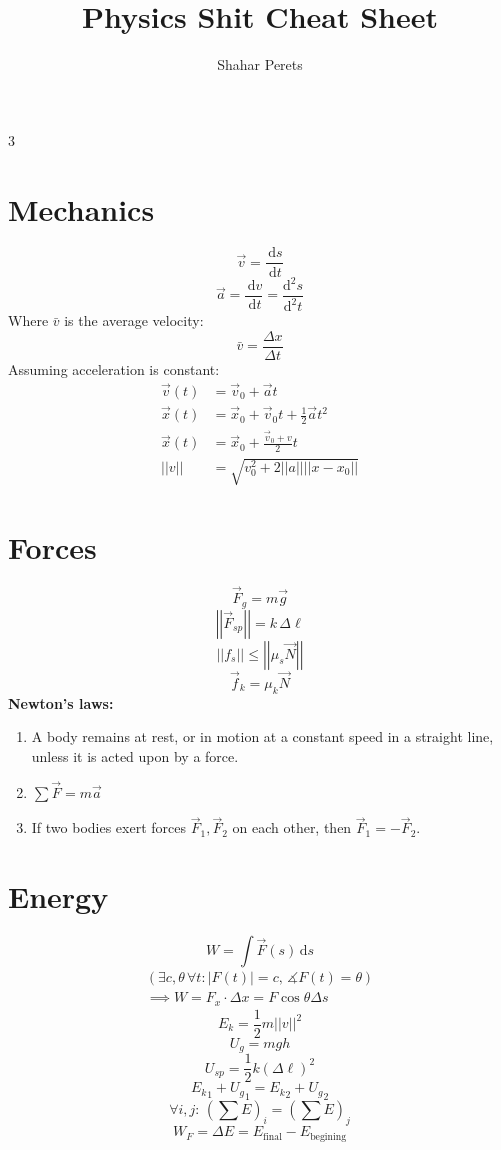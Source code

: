 \documentclass[]{article}
\author{Shahar Perets}
\title{Physics Shit Cheat Sheet}
\newcommand\cost  {\cos \theta}
\newcommand\dt    {\,\mathrm{d}t}
\newcommand\ds    {\,\mathrm{d}s}
\newcommand\dv    {\,\mathrm{d}v}
\newcommand\md    {\mathrm{d}}
\newcommand\tg        {\theta}
\newcommand\Dg        {\Delta}
\newcommand\co        {\colon}
\newcommand\cl [1]    {\left ( #1 \right )}
\newcommand\norm[1]   {\left \vert \left \vert #1 \right \vert \right \vert}
\begin{document}
	\begin{multicols}{3}
		\section{Mechanics}
		\[ \vec v = \frac{\ds}{\dt} \]
		\[ \vec a = \frac{\dv}{\dt} = \frac{\md^{2}s}{\md^{2}t} \]
        Where $\bar v$ is the average velocity:
		\[ \bar v = \frac{\Dg x}{\Dg t} \]
        Assuming acceleration is constant:
		\begin{align*}
			\vec v(t) &= \vec v_0 + \vec at \\
			\vec x(t) &= \vec x_0 + \vec v_0t + \frac{1}{2}\vec at^2 \\
			\vec x(t) &= \vec x_0 + \frac{\vec v_0 + v}{2}t \\
			\norm{v} &= \sqrt{v_0^2 + 2\norm a\norm {x - x_0}} 
		\end{align*}
		
		\section{Forces}
		\[ \vec F_g = m\vec g \]
		\[ \norm{\vec F_{sp}} = k \, \Dg \ell \]
		\[ \norm{f_s} \le \norm{\mu_s \vec N} \]
		\[ \vec f_k = \mu_k \vec N \]
        \textbf{Newton's laws: }
        \begin{enumerate}
            \item A body remains at rest, or in motion at a constant speed in a straight line, unless it is acted upon by a force. 
            \item \hfil $ \sum \vec F = m \vec a $
            \item If two bodies exert forces $\vec F_1, \vec F_2$ on each other, then $\vec F_1 = -\vec F_2$.
        \end{enumerate}
        
		\section{Energy}
		\[ W = \int \vec F(s) \ds \]
		\begin{gather*}
			(\exists c, \tg\, \forall t \co |F(t)| = c, \, \measuredangle F(t) = \tg) \\
			\implies W = F_x \cdot \Dg x = F\cost \Dg s
		\end{gather*}
		\[ E_k = \frac{1}{2}m\norm{v}^2 \]
		\[ U_g = mgh \]
		\[ U_{sp} = \frac{1}{2}k(\Dg \ell)^2 \]
		\[ {E_k}_1 + {U_g}_1 = {E_k}_2 + {U_g}_2 \]
        \[ \textstyle \forall i, j \co \, \cl{\sum E}_i = \cl{\sum E}_j \]
		\[ W_F = \Dg E = E_{\mathrm{final}} - E_{\mathrm{begining}} \]
        

\end{multicols}
\end{document}
